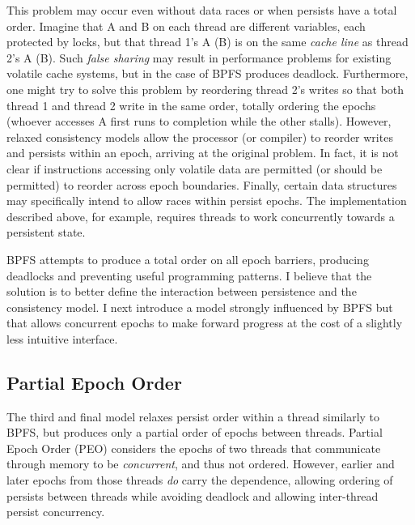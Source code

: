 This problem may occur even without data races or when persists have a total order.
Imagine that A and B on each thread are different variables, each protected by locks, but that thread 1's A (B) is on the same \emph{cache line} as thread 2's A (B).
Such \emph{false sharing} may result in performance problems for existing volatile cache systems, but in the case of BPFS produces deadlock.
Furthermore, one might try to solve this problem by reordering thread 2's writes so that both thread 1 and thread 2 write in the same order, totally ordering the epochs (whoever accesses A first runs to completion while the other stalls).
However, relaxed consistency models allow the processor (or compiler) to reorder writes and persists within an epoch, arriving at the original problem.
In fact, it is not clear if instructions accessing only volatile data are permitted (or should be permitted) to reorder across epoch boundaries.
Finally, certain data structures may specifically intend to allow races within persist epochs.
The \GroupCommit implementation described above, for example, requires threads to work concurrently towards a persistent state.

BPFS attempts to produce a total order on all epoch barriers, producing deadlocks and preventing useful programming patterns.
I believe that the solution is to better define the interaction between persistence and the consistency model.
I next introduce a model strongly influenced by BPFS but that allows concurrent epochs to make forward progress at the cost of a slightly less intuitive interface.

\subsection{Partial Epoch Order}
\label{sec:PMC:PersistenceModels:PEO}

The third and final model relaxes persist order within a thread similarly to BPFS, but produces only a partial order of epochs between threads.
Partial Epoch Order (PEO) considers the epochs of two threads that communicate through memory to be \emph{concurrent}, and thus not ordered.
However, earlier and later epochs from those threads \emph{do} carry the dependence, allowing ordering of persists between threads while avoiding deadlock and allowing inter-thread persist concurrency.

